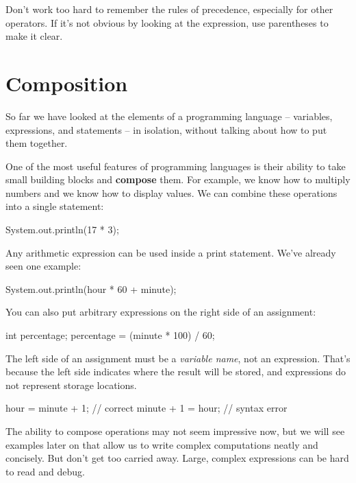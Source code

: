 \documentclass[12pt]{book}
\theoremstyle{exercise}
\begin{document}
Don't work too hard to remember the rules of precedence, especially for other operators.
If it's not obvious by looking at the expression, use parentheses to make it clear.


\section{Composition}



So far we have looked at the elements of a programming language -- variables, expressions, and statements -- in isolation, without talking about how to put them together.

One of the most useful features of programming languages is their ability to take small building blocks and {\bf compose} them.
For example, we know how to multiply numbers and we know how to display values.
We can combine these operations into a single statement:

\begin{code}
    System.out.println(17 * 3);
\end{code}

Any arithmetic expression can be used inside a print statement.
We've already seen one example:

\begin{code}
    System.out.println(hour * 60 + minute);
\end{code}

You can also put arbitrary expressions on the right side of an assignment:

\begin{code}
    int percentage;
    percentage = (minute * 100) / 60;
\end{code}

The left side of an assignment must be a {\em variable name}, not an expression.
That's because the left side indicates where the result will be stored, and expressions do not represent storage locations.

\begin{code}
    hour = minute + 1;  // correct
    minute + 1 = hour;  // syntax error
\end{code}


The ability to compose operations may not seem impressive now, but we will see examples later on that allow us to write complex computations neatly and concisely.
But don't get too carried away.
Large, complex expressions can be hard to read and debug.
\end{document}
